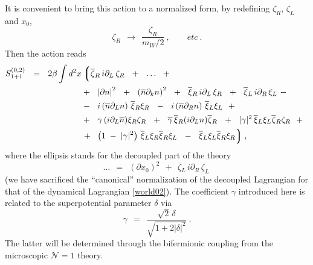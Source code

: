 \documentclass{article}
\newcommand{\p}{\partial}
\newcommand{\ov}{\overline}
\newcommand{\mc}[1]{\mathcal{#1}}
\newcommand{\lgr}{\left\lgroup}
\newcommand{\rgr}{\right\rgroup}
\newcommand{\bxir}{\ov{\xi}{}_R}
\newcommand{\bxil}{\ov{\xi}{}_L}
\newcommand{\xir}{\xi_R}
\newcommand{\xil}{\xi_L}
\newcommand{\bzl}{\ov{\zeta}{}_L}
\newcommand{\bzr}{\ov{\zeta}{}_R}
\newcommand{\zr}{\zeta_R}
\newcommand{\zl}{\zeta_L}
\newcommand{\nbar}{\ov{n}}
\begin{document}
	It is convenient to bring this action to a normalized form, by redefining $ \zr $, $ \zl $ and $ x_0 $,
\[
	\zr ~~\to~~ \frac {\zr}  {{m_W}/{2}}~, \qquad etc~.
\]
	Then the action reads
\begin{align}
%
\notag
S_{1+1}^{(0,2)} ~~=~~ 2\beta
	\int d^2 x 
	&
\lgr
	\bzr\, i\p_L\, \zr ~~+~~ \dots ~~+~~
\right.
	\\
%
\label{world02}
	&
	+~~
	\left|\p n\right|^2 ~~+~~ \left(\ov{n}\p_k n\right)^2 ~~+~~
	\bxir \, i\p_L \, \xir  ~~+~~ \bxil \, i\p_R \, \xil 
	~-~
	\\
%
\notag
	&
	-~~
	i \left(\ov{n}\p_L n\right)\, \bxir \xir ~~-~~ 
	i \left(\ov{n}\p_R n\right)\, \bxil \xil ~~+~~
	\\
%
\notag
	&
	+~~
	\gamma\, (i\p_L\nbar) \xir\zr ~~+~~ \ov{\gamma}\, \bxir (i\p_L n) \bzr ~~+~~
	|\gamma|^2\, \bxil\xil \bzr\zr ~~+~~
	\\
%
\notag
	&
\left.
	+~~ 
	\left( 1 \;-\; |\gamma|^2 \right)\, \bxil\xir \bxir\xil  
	~~-~~ \bxil\xil \bxir\xir
\rgr ,
\end{align}
	where the ellipsis stands for the decoupled part of the theory
\[
	\dots ~~=~~ \left(\p x_0\right)^2 ~~+~~ \bzl\, i\p_R\, \zl ~
\]
	(we have sacrificed the ``canonical'' normalization of the decoupled Lagrangian for that of the
	dynamical Lagrangian \eqref{world02}).
	The coefficient $ \gamma $ introduced here is related to the superpotential parameter $ \delta $ via
\[
	\gamma ~~=~~ \frac { \sqrt{2}\,\delta } { \sqrt{ 1 +  2 |\delta|^2 } }~.
\]
	The latter will be determined through the bifermionic coupling from the microscopic $\mc{N}=1$ theory.
\end{document}
